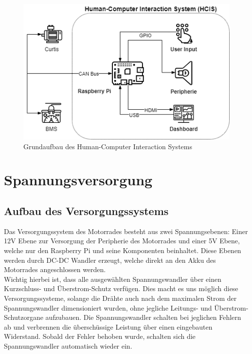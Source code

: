 \begin{figure}[H]
	\begin{center}
		\includegraphics[scale=0.5]{figures/hcis/HCIS_Grundfunktion.png}
		\caption{Grundaufbau des Human-Computer Interaction Systems}
		\label{fig:aufbauHCIS}
	\end{center}
\end{figure}

\newpage



\section{Spannungsversorgung}

\subsection{Aufbau des Versorgungssystems} \label{sec:aufbauversorgung}

Das Versorgungssystem des Motorrades besteht aus zwei Spannungsebenen: Einer 12V Ebene zur Versorgung der Peripherie des Motorrades und einer 5V Ebene, welche nur den Raspberry Pi und seine Komponenten beinhaltet. Diese Ebenen werden durch DC-DC Wandler erzeugt, welche direkt an den Akku des Motorrades angeschlossen werden. \\

Wichtig hierbei ist, dass alle ausgewählten Spannungswandler über einen Kurzschluss- und Überstrom-Schutz verfügen. Dies macht es uns möglich diese Versorgungssysteme, solange die Drähte auch nach dem maximalen Strom der Spannungswandler dimensioniert wurden, ohne jegliche Leitungs- und Überstrom-Schutzorgane aufzubauen. Die Spannungswandler schalten bei jeglichen Fehlern ab und verbrennen die überschüssige Leistung über einen eingebauten Widerstand. Sobald der Fehler behoben wurde, schalten sich die Spannungswandler automatisch wieder ein.


